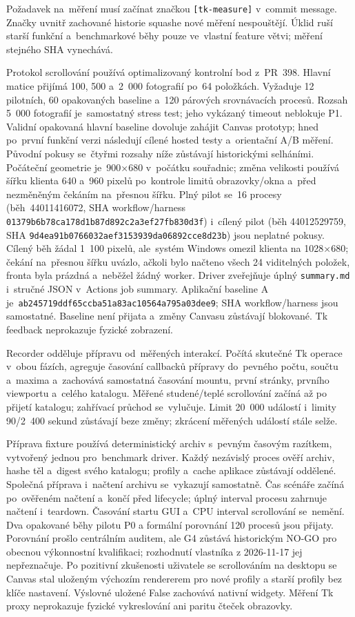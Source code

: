 \documentclass[11pt,a4paper]{article}
\newcommand{\codeword}[1]{\nolinkurl{#1}}
\begin{document}
Požadavek na~měření musí začínat značkou \codeword{[tk-measure]}
v~commit message. Značky uvnitř zachované historie squashe nové měření
nespouštějí. Úklid ruší starší funkční a~benchmarkové běhy pouze ve~vlastní
feature větvi; měření stejného SHA vynechává.

Protokol scrollování používá optimalizovaný kontrolní bod z~PR~398.
Hlavní matice přijímá 100, 500 a~2~000 fotografií po~64 položkách. Vyžaduje
12 pilotních, 60 opakovaných baseline a~120 párových srovnávacích procesů.
Rozsah 5~000 fotografií je~samostatný stress test; jeho vykázaný timeout
neblokuje P1. Validní opakovaná hlavní baseline dovoluje zahájit Canvas prototyp;
hned po~první funkční verzi následují cílené hosted testy a~orientační A/B měření.
Původní pokusy se~čtyřmi rozsahy níže zůstávají historickými selháními. Počáteční geometrie je~900×680 v~počátku
souřadnic; změna velikosti používá šířku klienta 640 a~960 pixelů po~kontrole
limitů obrazovky/okna a~před nezměněným čekáním na~přesnou šířku. Plný pilot
se~16 procesy (běh~44011416072, SHA workflow/harness
\codeword{01379b6b78ca178d1b87d892c2a3ef27fb830d3f}) i~cílený pilot (běh
44012529759, SHA \codeword{9d4ea91b0766032aef3153939da06892cce8d23b}) jsou
neplatné pokusy. Cílený běh žádal 1~100 pixelů, ale~systém Windows omezil klienta na
1028×680; čekání na~přesnou šířku uvázlo, ačkoli bylo načteno všech 24
viditelných položek, fronta byla prázdná a~neběžel žádný worker.
Driver zveřejňuje úplný \codeword{summary.md} i~stručné JSON v~Actions job
summary. Aplikační baseline A je~\codeword{ab245719ddf65ccba51a83ac10564a795a03dee9};
SHA workflow/harness jsou samostatné. Baseline není přijata a~změny Canvasu
zůstávají blokované. Tk feedback neprokazuje fyzické zobrazení.

Recorder odděluje přípravu od~měřených interakcí. Počítá skutečné Tk operace
v~obou fázích, agreguje časování callbacků přípravy do~pevného počtu, součtu
a~maxima a~zachovává samostatná časování mountu, první stránky, prvního
viewportu a~celého katalogu. Měřené studené/teplé scrollování začíná až po
přijetí katalogu; zahřívací průchod se~vylučuje. Limit 20~000 událostí i~limity
90/2~400 sekund zůstávají beze změny; zkrácení měřených událostí stále selže.

Příprava fixture používá deterministický archiv s~pevným časovým razítkem,
vytvořený jednou pro~benchmark driver. Každý nezávislý proces ověří archiv,
hashe těl a~digest svého katalogu; profily a~cache aplikace zůstávají oddělené.
Společná příprava i~načtení archivu se~vykazují samostatně. Čas scénáře začíná
po~ověřeném načtení a~končí před lifecycle; úplný interval procesu zahrnuje
načtení i~teardown. Časování startu GUI a~CPU interval scrollování se~nemění.
Dva opakované běhy pilotu P0 a formální porovnání 120 procesů jsou přijaty.
Porovnání prošlo centrálním auditem, ale G4 zůstává historickým NO-GO pro
obecnou výkonnostní kvalifikaci; rozhodnutí vlastníka z 2026-11-17 jej
nepřeznačuje. Po pozitivní zkušenosti uživatele se scrollováním na desktopu
se Canvas stal uloženým výchozím rendererem pro nové profily a starší profily
bez klíče nastavení. Výslovné uložené False zachovává nativní widgety. Měření
Tk proxy neprokazuje fyzické vykreslování ani paritu čteček obrazovky.
\end{document}
